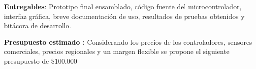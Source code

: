 \documentclass[a4paper,12pt]{article}
\begin{document}
\textbf{Entregables}: 
Prototipo final ensamblado, código fuente del microcontrolador, interfaz gráfica, breve documentación de uso, resultados de pruebas obtenidos y bitácora de desarrollo. \newline

\textbf{Presupuesto estimado :} Considerando los precios de los controladores, sensores comerciales, precios regionales y un margen flexible se propone el siguiente presupuesto de   \$100.000

\end{document}
